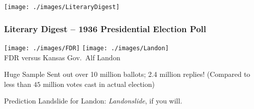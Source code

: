 \documentclass[handout]{beamer}
\begin{document}
\begin{frame}
\begin{center}
\texttt{[image: ./images/LiteraryDigest]}
\end{center}

\end{frame}

\begin{frame}

\frametitle{Literary Digest -- 1936 Presidential Election Poll}

\begin{center}
\texttt{[image: ./images/FDR]}
\texttt{[image: ./images/Landon]}\\
\small FDR versus Kansas Gov.\ Alf Landon
\end{center}

\normalsize

\begin{block}{Huge Sample}
Sent out over 10 million ballots; 2.4 million replies! (Compared to  less than $45$ million votes cast in actual election)
\end{block}

\begin{block}{Prediction}
Landslide for Landon: \emph{Landonslide},  if you will.
\end{block}
\end{frame}
\end{document}
